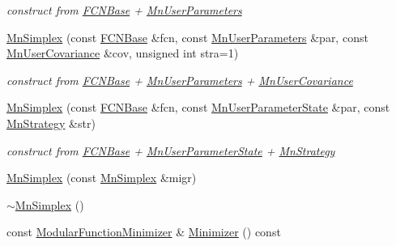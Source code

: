 \begin{DoxyCompactItemize}
\begin{DoxyCompactList}\small\item\em construct from \mbox{\hyperlink{classROOT_1_1Minuit2_1_1FCNBase}{F\+C\+N\+Base}} + \mbox{\hyperlink{classROOT_1_1Minuit2_1_1MnUserParameters}{Mn\+User\+Parameters}} \end{DoxyCompactList}\item 
\mbox{\hyperlink{classROOT_1_1Minuit2_1_1MnSimplex_a6583a53c38490030a1ff7fe80bdc69bc}{Mn\+Simplex}} (const \mbox{\hyperlink{classROOT_1_1Minuit2_1_1FCNBase}{F\+C\+N\+Base}} \&fcn, const \mbox{\hyperlink{classROOT_1_1Minuit2_1_1MnUserParameters}{Mn\+User\+Parameters}} \&par, const \mbox{\hyperlink{classROOT_1_1Minuit2_1_1MnUserCovariance}{Mn\+User\+Covariance}} \&cov, unsigned int stra=1)
\begin{DoxyCompactList}\small\item\em construct from \mbox{\hyperlink{classROOT_1_1Minuit2_1_1FCNBase}{F\+C\+N\+Base}} + \mbox{\hyperlink{classROOT_1_1Minuit2_1_1MnUserParameters}{Mn\+User\+Parameters}} + \mbox{\hyperlink{classROOT_1_1Minuit2_1_1MnUserCovariance}{Mn\+User\+Covariance}} \end{DoxyCompactList}\item 
\mbox{\hyperlink{classROOT_1_1Minuit2_1_1MnSimplex_a3dc51e6d9719501f7fce44a66444c6d2}{Mn\+Simplex}} (const \mbox{\hyperlink{classROOT_1_1Minuit2_1_1FCNBase}{F\+C\+N\+Base}} \&fcn, const \mbox{\hyperlink{classROOT_1_1Minuit2_1_1MnUserParameterState}{Mn\+User\+Parameter\+State}} \&par, const \mbox{\hyperlink{classROOT_1_1Minuit2_1_1MnStrategy}{Mn\+Strategy}} \&str)
\begin{DoxyCompactList}\small\item\em construct from \mbox{\hyperlink{classROOT_1_1Minuit2_1_1FCNBase}{F\+C\+N\+Base}} + \mbox{\hyperlink{classROOT_1_1Minuit2_1_1MnUserParameterState}{Mn\+User\+Parameter\+State}} + \mbox{\hyperlink{classROOT_1_1Minuit2_1_1MnStrategy}{Mn\+Strategy}} \end{DoxyCompactList}\item 
\mbox{\hyperlink{classROOT_1_1Minuit2_1_1MnSimplex_a47aec4c766dc559a1a1e1fe7809d0a88}{Mn\+Simplex}} (const \mbox{\hyperlink{classROOT_1_1Minuit2_1_1MnSimplex}{Mn\+Simplex}} \&migr)
\item 
\mbox{\hyperlink{classROOT_1_1Minuit2_1_1MnSimplex_a0cab2c1cf29e82fdd340eb78e0cd7ff2}{$\sim$\+Mn\+Simplex}} ()
\item 
const \mbox{\hyperlink{classROOT_1_1Minuit2_1_1ModularFunctionMinimizer}{Modular\+Function\+Minimizer}} \& \mbox{\hyperlink{classROOT_1_1Minuit2_1_1MnSimplex_a8fa3495353e667d85e7dbeaffa94b94c}{Minimizer}} () const

\end{DoxyCompactItemize}
